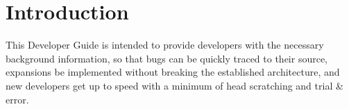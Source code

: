 
\newcommand{\doctitle}{MyProject Developer Guide}
\newcommand{\docauthors}{Martin Baute}



\section{Introduction}

This Developer Guide is intended to provide developers with the necessary
background information, so that bugs can be quickly traced to their source,
expansions be implemented without breaking the established architecture,
and new developers get up to speed with a minimum of head scratching and
trial \& error. %




